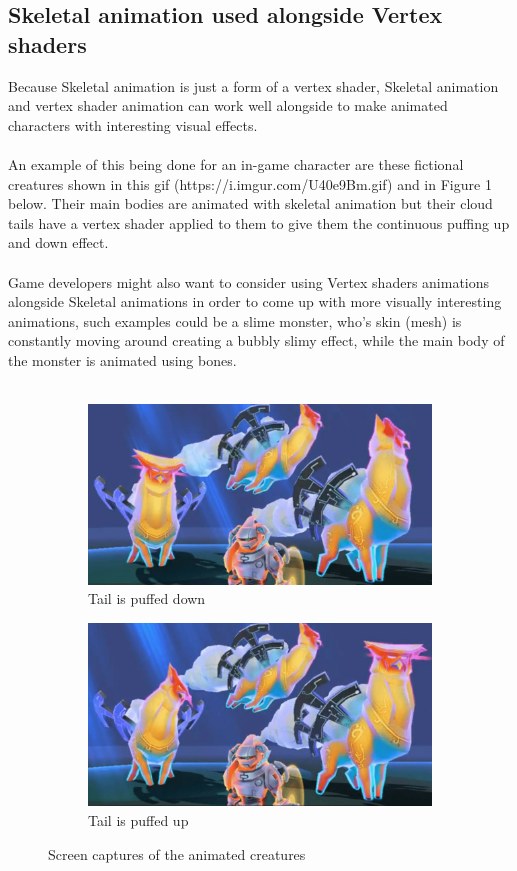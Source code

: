 \documentclass{scrartcl}
\begin{document}
\subsection{Skeletal animation used alongside Vertex shaders}
Because Skeletal animation is just a form of a vertex shader, Skeletal animation and vertex shader animation can work well alongside to make animated characters with interesting visual effects.
\\~\\
An example of this being done for an in-game character are these fictional creatures shown in this gif (https://i.imgur.com/U40e9Bm.gif) and in Figure 1 below. Their main bodies are animated with skeletal animation but their cloud tails have a vertex shader applied to them to give them the continuous puffing up and down effect.
\\~\\
Game developers might also want to consider using Vertex shaders animations alongside Skeletal animations in order to come up with more visually interesting animations, such examples could be a slime monster, who's skin (mesh) is constantly moving around creating a bubbly slimy effect, while the main body of the monster is animated using bones.
\\~\\
\begin{figure}[h!]
  \centering
  \begin{subfigure}[b]{0.4\linewidth}
    \includegraphics[width=\linewidth]{Capture1.jpg}
    \caption{Tail is puffed down}
  \end{subfigure}
  \begin{subfigure}[b]{0.4\linewidth}
    \includegraphics[width=\linewidth]{Capture2.jpg}
    \caption{Tail is puffed up}
  \end{subfigure}
  \caption{Screen captures of the animated creatures}
  \label{fig:anim}
\end{figure}
\end{document}
